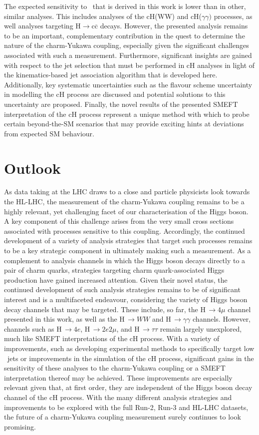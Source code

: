 The expected sensitivity to \kappac\, that is derived in this work is lower than in other, similar analyses. This includes analyses of the cH(WW) and cH($\gamma\gamma)$ processes, as well analyses targeting H$\rightarrow \mathrm{c\overline{c}}$ decays. However, the presented analysis remains to be an important, complementary contribution in the quest to determine the nature of the charm-Yukawa coupling, especially given the significant challenges associated with such a measurement. Furthermore, significant insights are gained with respect to the jet selection that must be performed in cH analyses in light of the kinematics-based jet association algorithm that is developed here. Additionally, key systematic uncertainties such as the flavour scheme uncertainty in modelling the cH process are discussed and potential solutions to this uncertainty are proposed. Finally, the novel results of the presented SMEFT interpretation of the cH process represent a unique method with which to probe certain beyond-the-SM scenarios that may provide exciting hints at deviations from expected SM behaviour. 
\section*{Outlook}
As data taking at the LHC draws to a close and particle physicists look towards the HL-LHC, the measurement of the charm-Yukawa coupling remains to be a highly relevant, yet challenging facet of our characterisation of the Higgs boson. A key component of this challenge arises from the very small cross sections associated with processes sensitive to this coupling. Accordingly, the continued development of a variety of analysis strategies that target such processes remains to be a key strategic component in ultimately making such a measurement. As a complement to analysis channels in which the Higgs boson decays directly to a pair of charm quarks, strategies targeting charm quark-associated Higgs production have gained increased attention. Given their novel status, the continued development of such analysis strategies remains to be of significant interest and is a multifaceted endeavour, considering the variety of Higgs boson decay channels that may be targeted. These include, so far, the H$\,\rightarrow4\mu$ channel presented in this work, as well as the H$\,\rightarrow WW$ and H$\,\rightarrow \gamma\gamma$ channels. However, channels such as H$\,\rightarrow 4e$, H$\,\rightarrow 2e2\mu$, and H$\,\rightarrow \tau\tau$ remain largely unexplored, much like SMEFT interpretations of the cH process. With a variety of improvements, such as developing experimental methods to specifically target low \pt \, jets or improvements in the simulation of the cH process, significant gains in the sensitivity of these analyses to the charm-Yukawa coupling or a SMEFT interpretation thereof may be achieved. These improvements are especially relevant given that, at first order, they are independent of the Higgs boson decay channel of the cH process. With the many different analysis strategies and improvements to be explored with the full Run-2, Run-3 and HL-LHC datasets, the future of a charm-Yukawa coupling measurement surely continues to look promising.